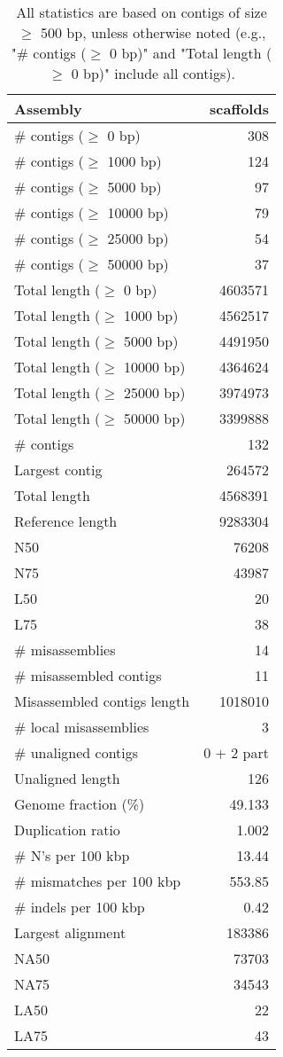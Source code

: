 \documentclass[12pt,a4paper]{article}
\begin{document}
\begin{table}[ht]
\begin{center}
\caption{All statistics are based on contigs of size $\geq$ 500 bp, unless otherwise noted (e.g., "\# contigs ($\geq$ 0 bp)" and "Total length ($\geq$ 0 bp)" include all contigs).}
\begin{tabular}{|l*{1}{|r}|}
\hline
Assembly & scaffolds \\ \hline
\# contigs ($\geq$ 0 bp) & 308 \\ \hline
\# contigs ($\geq$ 1000 bp) & 124 \\ \hline
\# contigs ($\geq$ 5000 bp) & 97 \\ \hline
\# contigs ($\geq$ 10000 bp) & 79 \\ \hline
\# contigs ($\geq$ 25000 bp) & 54 \\ \hline
\# contigs ($\geq$ 50000 bp) & 37 \\ \hline
Total length ($\geq$ 0 bp) & 4603571 \\ \hline
Total length ($\geq$ 1000 bp) & 4562517 \\ \hline
Total length ($\geq$ 5000 bp) & 4491950 \\ \hline
Total length ($\geq$ 10000 bp) & 4364624 \\ \hline
Total length ($\geq$ 25000 bp) & 3974973 \\ \hline
Total length ($\geq$ 50000 bp) & 3399888 \\ \hline
\# contigs & 132 \\ \hline
Largest contig & 264572 \\ \hline
Total length & 4568391 \\ \hline
Reference length & 9283304 \\ \hline
N50 & 76208 \\ \hline
N75 & 43987 \\ \hline
L50 & 20 \\ \hline
L75 & 38 \\ \hline
\# misassemblies & 14 \\ \hline
\# misassembled contigs & 11 \\ \hline
Misassembled contigs length & 1018010 \\ \hline
\# local misassemblies & 3 \\ \hline
\# unaligned contigs & 0 + 2 part \\ \hline
Unaligned length & 126 \\ \hline
Genome fraction (\%) & 49.133 \\ \hline
Duplication ratio & 1.002 \\ \hline
\# N's per 100 kbp & 13.44 \\ \hline
\# mismatches per 100 kbp & 553.85 \\ \hline
\# indels per 100 kbp & 0.42 \\ \hline
Largest alignment & 183386 \\ \hline
NA50 & 73703 \\ \hline
NA75 & 34543 \\ \hline
LA50 & 22 \\ \hline
LA75 & 43 \\ \hline
\end{tabular}
\end{center}
\end{table}
\end{document}
